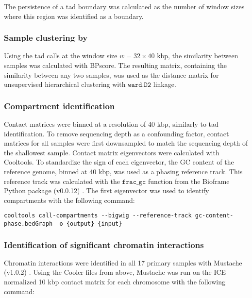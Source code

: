 The persistence of a \gls{tad} boundary was calculated as the number of window sizes where this region was identified as a boundary.

\subsubsection{Sample clustering by }

Using the \gls{tad} calls at the window size $w = 32 \times 40 \text{ kbp}$, the similarity between samples was calculated with BPscore.
The resulting matrix, containing the similarity between any two samples, was used as the distance matrix for unsupervised hierarchical clustering with $\texttt{ward.D2}$ linkage.

\subsubsection{Compartment identification}

Contact matrices were binned at a resolution of 40 kbp, similarly to \gls{tad} identification.
To remove sequencing depth as a confounding factor, contact matrices for all samples were first downsampled to match the sequencing depth of the shallowest sample.
Contact matrix eigenvectors were calculated with Cooltools.
To standardize the sign of each eigenvector, the GC content of the reference genome, binned at 40 kbp, was used as a phasing reference track.
This reference track was calculated with the $\texttt{frac\_gc}$ function from the Bioframe Python package (v0.0.12) \cite{nezarabdennurMirnylabBioframeV02020}.
The first eigenvector was used to identify compartments with the following command:

\begin{lstlisting}[basicstyle=\ttfamily]
cooltools call-compartments --bigwig --reference-track gc-content-phase.bedGraph -o {output} {input}
\end{lstlisting}

\subsubsection{Identification of significant chromatin interactions}

Chromatin interactions were identified in all 17 primary samples with Mustache (v1.0.2) \cite{roayaeiardakanyMustacheMultiscaleDetection2020}.
Using the Cooler files from above, Mustache was run on the ICE-normalized 10 kbp contact matrix for each chromosome with the following command:

